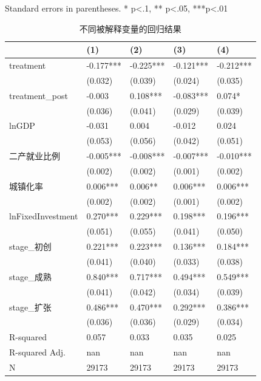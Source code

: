\bigskip
Standard errors in parentheses. \newline 
* p<.1, ** p<.05, ***p<.01\begin{table}
\caption{不同被解释变量的回归结果}
\label{}
\begin{center}
\begin{tabular}{lllll}
\hline
                  & (1)       & (2)       & (3)       & (4)        \\
\hline
treatment         & -0.177*** & -0.225*** & -0.121*** & -0.212***  \\
                  & (0.032)   & (0.039)   & (0.024)   & (0.035)    \\
treatment\_post   & -0.003    & 0.108***  & -0.083*** & 0.074*     \\
                  & (0.036)   & (0.041)   & (0.029)   & (0.039)    \\
lnGDP             & -0.031    & 0.004     & -0.012    & 0.024      \\
                  & (0.053)   & (0.056)   & (0.042)   & (0.051)    \\
二产就业比例            & -0.005*** & -0.008*** & -0.007*** & -0.010***  \\
                  & (0.002)   & (0.002)   & (0.001)   & (0.002)    \\
城镇化率              & 0.006***  & 0.006**   & 0.006***  & 0.006***   \\
                  & (0.002)   & (0.002)   & (0.001)   & (0.002)    \\
lnFixedInvestment & 0.270***  & 0.229***  & 0.198***  & 0.196***   \\
                  & (0.051)   & (0.055)   & (0.041)   & (0.050)    \\
stage\_初创         & 0.221***  & 0.223***  & 0.136***  & 0.184***   \\
                  & (0.041)   & (0.040)   & (0.033)   & (0.038)    \\
stage\_成熟         & 0.840***  & 0.717***  & 0.494***  & 0.549***   \\
                  & (0.041)   & (0.042)   & (0.034)   & (0.039)    \\
stage\_扩张         & 0.486***  & 0.470***  & 0.292***  & 0.386***   \\
                  & (0.036)   & (0.036)   & (0.029)   & (0.034)    \\
R-squared         & 0.057     & 0.033     & 0.035     & 0.025      \\
R-squared Adj.    & nan       & nan       & nan       & nan        \\
N                 & 29173     & 29173     & 29173     & 29173      \\
\hline
\end{tabular}
\end{center}
\end{table}
